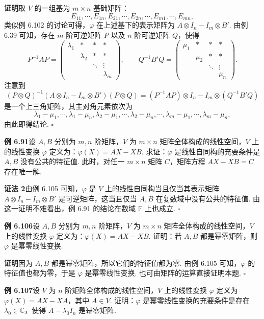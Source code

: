 \documentclass[UTF8, 12pt, fontset=fandol, oneside]{ctexart}
\begin{document}
\noindent\textbf{证明}\quad 取 $V$ 的一组基为 $m\times n$ 基础矩阵：
\[
E_{11},\cdots,E_{1n},E_{21},\cdots,E_{2n},\cdots,E_{m1},\cdots,E_{mn},
\]
类似例 6.102 的讨论可得，$\varphi$ 在上述基下的表示矩阵为 $A\otimes I_n-I_m\otimes B'$. 由例 6.39 可知，存在 $m$ 阶可逆矩阵 $P$ 以及 $n$ 阶可逆矩阵 $Q$，使得
\[
P^{-1}AP=
\begin{pmatrix}
\lambda_1&*&*&*\\
&\lambda_2&*&*\\
&&\ddots&\vdots\\
&&&\lambda_m
\end{pmatrix},\qquad
Q^{-1}B'Q=
\begin{pmatrix}
\mu_1&*&*&*\\
&\mu_2&*&*\\
&&\ddots&\vdots\\
&&&\mu_n
\end{pmatrix}.
\]
注意到
\[
(P\otimes Q)^{-1}(A\otimes I_n-I_m\otimes B')(P\otimes Q)=(P^{-1}AP)\otimes I_n-I_m\otimes(Q^{-1}B'Q)
\]
是一个上三角矩阵，其主对角元素依次为
\[
\lambda_1-\mu_1,\cdots,\lambda_1-\mu_n,\lambda_2-\mu_1,\cdots,\lambda_2-\mu_n,\cdots,\lambda_m-\mu_1,\cdots,\lambda_m-\mu_n,
\]
由此即得结论. $\square$

\noindent\textbf{例 6.91}\quad 设 $A,B$ 分别为 $m,n$ 阶矩阵，$V$ 为 $m\times n$ 矩阵全体构成的线性空间，$V$ 上的线性变换 $\varphi$ 定义为：$\varphi(X)=AX-XB$. 求证：$\varphi$ 是线性自同构的充要条件是 $A,B$ 没有公共的特征值. 此时，对任一 $m\times n$ 矩阵 $C$，矩阵方程 $AX-XB=C$ 存在唯一解.

\noindent\textbf{证法 2}\quad 由例 6.105 可知，$\varphi$ 是 $V$ 上的线性自同构当且仅当其表示矩阵 $A\otimes I_n-I_m\otimes B'$ 是可逆矩阵，这当且仅当 $A,B$ 在复数域中没有公共的特征值. 由这一证明不难看出，例 6.91 的结论在数域 $\mathbb{F}$ 上也成立. $\square$

\noindent\textbf{例 6.106}\quad 设 $A,B$ 分别为 $m,n$ 阶矩阵，$V$ 为 $m\times n$ 矩阵全体构成的线性空间，$V$ 上的线性变换 $\varphi$ 定义为：$\varphi(X)=AX-XB$. 证明：若 $A,B$ 都是幂零矩阵，则 $\varphi$ 是幂零线性变换.

\noindent\textbf{证明}\quad 因为 $A,B$ 都是幂零矩阵，所以它们的特征值都为零. 由例 6.105 可知，$\varphi$ 的特征值也都为零，于是 $\varphi$ 是幂零线性变换. 也可由矩阵的运算直接证明本题. $\square$

\noindent\textbf{例 6.107}\quad 设 $V$ 为 $n$ 阶矩阵全体构成的线性空间，$V$ 上的线性变换 $\varphi$ 定义为 $\varphi(X)=AX-XA$，其中 $A\in V$. 证明：$\varphi$ 是幂零线性变换的充要条件是存在 $\lambda_0\in\mathbb{C}$，使得 $A-\lambda_0I_n$ 是幂零矩阵.
\end{document}
